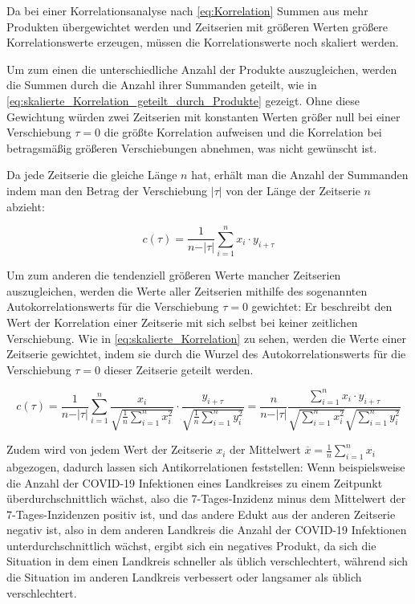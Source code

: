 Da bei einer Korrelationsanalyse nach \autoref{eq:Korrelation} Summen aus mehr Produkten übergewichtet werden und Zeitserien mit größeren Werten größere Korrelationswerte erzeugen, müssen die Korrelationswerte noch skaliert werden.

Um zum einen die unterschiedliche Anzahl der Produkte auszugleichen, werden die Summen durch die Anzahl ihrer Summanden geteilt, wie in \autoref{eq:skalierte_Korrelation_geteilt_durch_Produkte} gezeigt. Ohne diese Gewichtung würden zwei Zeitserien mit konstanten Werten größer null bei einer Verschiebung $\tau=0$ die größte Korrelation aufweisen und die Korrelation bei betragsmäßig größeren Verschiebungen abnehmen, was nicht gewünscht ist.

Da jede Zeitserie die gleiche Länge $n$ hat, erhält man die Anzahl der Summanden indem man
den Betrag der Verschiebung $\vert\tau\vert$
von der Länge der Zeitserie $n$ abzieht:

\begin{equation}\label{eq:skalierte_Korrelation_geteilt_durch_Produkte}
    c(\tau) =\frac{1}{n-\vert\tau\vert} \sum_{i=1}^n x_i\cdot y_{i+\tau}
\end{equation}

Um zum anderen die tendenziell größeren Werte mancher Zeitserien auszugleichen, werden die Werte aller Zeitserien mithilfe des sogenannten \glqq{}Autokorrelationswerts für die Verschiebung $\tau=0$\grqq{} gewichtet: Er beschreibt den Wert der Korrelation einer Zeitserie mit sich selbst bei keiner zeitlichen Verschiebung. Wie in \autoref{eq:skalierte_Korrelation} zu sehen, werden die Werte einer Zeitserie gewichtet, indem sie durch die Wurzel des Autokorrelationswerts für die Verschiebung $\tau=0$ dieser Zeitserie geteilt werden.

\begin{equation}\label{eq:skalierte_Korrelation}
    c(\tau) =
    \frac{1}{n-\vert\tau\vert}
    \sum_{i=1}^n
    \frac{x_i}{\sqrt{\frac{1}{n}\sum_{i=1}^n x_i^2}}
    \cdot
    \frac{y_{i+\tau}}{\sqrt{\frac{1}{n}\sum_{i=1}^n y_i^2}}
    =
    \frac{n}{n-\vert\tau\vert}
    \frac{\sum_{i=1}^n x_i \cdot y_{i+\tau}}
    {\sqrt{\sum_{i=1}^n x_i^2}
    \sqrt{\sum_{i=1}^n y_i^2}}
\end{equation}


Zudem wird von jedem Wert der Zeitserie $x_i$ der Mittelwert $\overline x = \frac{1}{n}\sum_{i=1}^n x_i$ abgezogen, dadurch lassen sich Antikorrelationen feststellen: Wenn beispielsweise die Anzahl der COVID-19 Infektionen eines Landkreises zu einem Zeitpunkt überdurchschnittlich wächst, also die 7-Tages-Inzidenz minus dem Mittelwert der 7-Tages-Inzidenzen positiv ist, und das andere Edukt aus der anderen Zeitserie negativ ist, also in dem anderen Landkreis die Anzahl der COVID-19 Infektionen unterdurchschnittlich wächst, ergibt sich ein negatives Produkt, da sich die Situation in dem einen Landkreis  schneller als üblich verschlechtert, während sich die Situation im anderen Landkreis verbessert oder langsamer als üblich verschlechtert.


